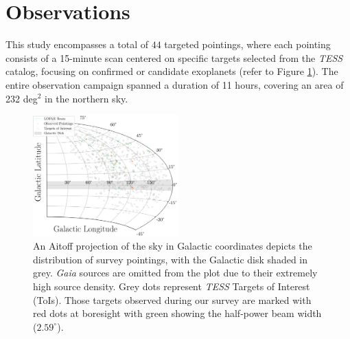 \section{Observations}\label{sec:observations}
This study encompasses a total of $44$ targeted pointings, where each pointing consists of a 15-minute scan centered on specific targets selected from the \textit{TESS} catalog, focusing on confirmed or candidate exoplanets (refer to Figure \ref{fig:TESS_TOIs}). The entire observation campaign spanned a duration of 11 hours, covering an area of 232 deg$^2$ in the northern sky. 

\begin{figure}[h!]
    \centering
    \includegraphics[width = 0.5\textwidth]{SETI/figures/TESS_progress/Aitoff_Projection_PSD.png}
    \caption{An Aitoff projection of the sky in Galactic coordinates depicts the distribution of survey pointings, with the Galactic disk shaded in grey. \textit{Gaia} sources are omitted from the plot due to their extremely high source density. Grey dots represent \textit{TESS} Targets of Interest (ToIs). Those targets observed during our survey are marked with red dots at boresight with green showing the half-power beam width ($2.59^\circ$).
  }
  \label{fig:TESS_TOIs}
\end{figure}

